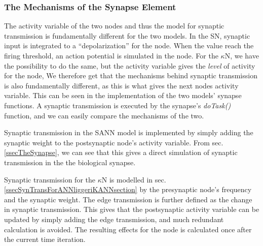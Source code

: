 		\subsubsection{The Mechanisms of the Synapse Element}
		The activity variable of the two nodes and thus the model for synaptic transmission is fundamentally different for the two models.
		In the SN, synaptic input is integrated to a ``depolarization'' for the node.
		When the value reach the firing threshold, an action potential is simulated in the node.
		For the $\kappa$N, we have the possibility to do the same, but the activity variable gives the \emph{level} of activity for the node, 
		We therefore get that the mechanisms behind synaptic transmission is also fundamentally different, as this is what gives the next nodes activity variable. %
		This can be seen in the implementation of the two models' synapse functions. 
		A synaptic transmission is executed by the synapse's \emph{doTask()} function, and we can easily compare the mechanisms of the two.

		Synaptic transmission in the SANN model is implemented by simply adding the synaptic weight to the postsynaptic node's activity variable.
		From sec. \ref{ssecTheSynapse}, we can see that this gives a direct simulation of synaptic transmission in the the biological synapse.

		Synaptic transmission for the $\kappa$N is modelled in sec. \ref{ssecSynTransForANNliggeriKANNsection} by the presynaptic node's frequency and the synaptic weight.
		The edge transmission is further defined as the change in synaptic transmission. %
		This gives that the postsynaptic activity variable can be updated by simply adding the edge transmission, and much redundant calculation is avoided.
		The resulting effects for the node is calculated once after the current time iteration.

